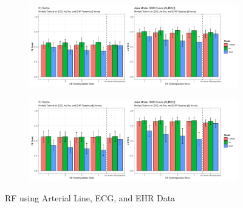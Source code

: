 \begin{figure}[htb]
    \centering
    \begin{subfigure}[htb]{0.49\textwidth}
        \includegraphics[width=\textwidth]{body/figures/all_6.svg}
    \end{subfigure}
    \hfill
    \begin{subfigure}[htb]{0.49\textwidth}
        \includegraphics[width=\textwidth]{body/figures/all_12.svg}
    \end{subfigure}
    \caption{RF using Arterial Line, ECG, and EHR Data}
    \label{fig:rf_sigEHR}
\end{figure}  %

\clearpage